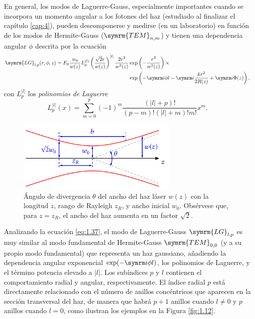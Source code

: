 En general, los modos de Laguerre-Gauss, especialmente importantes cuando se incorpora un momento angular a los fotones del haz (estudiado al finalizar el capítulo \ref{cap:4}), pueden descomponerse y medirse (en un laboratorio) en función de los modos de Hermite-Gauss \autocite{DErrico2017} ($\symrm{TEM}_{n,m}$) y tienen una dependencia angular $\phi$ descrita por la ecuación 
\begin{equation}\label{eq:1.37}
  \begin{split} 
    \symrm{LG}_{l,p}(r,\phi,z) = E_{0}\frac{w_{0}}{w(z)}L_{p}^{(l)} \left(\frac{\sqrt{2}r}{w(z)}\right)^{|l|}\frac{2r^{2}}{w^{2}(z)}&\exp \left(-\frac{r^{2}}{w^{2}(z)}\right)\times \\ 
    & \exp \left(- \iu \phi l - \iu \frac{kr^{2}}{2R(z)} + \iu \Phi(z)\right),
  \end{split}
\end{equation}
con $L_{p}^{|l|}$ los \emph{polinomios de Laguerre}
\begin{equation}\label{eq:1.38}
  L_{p}^{|l|}(x) = \sum_{m=0}^{p}(-1)^{m}\frac{(|l|+p)!}{(p-m)!(|l|+m)!m!}x^{m}.
\end{equation}

\begin{figure}[htbp]
  \centering
  \includegraphics[width=0.7\textwidth]{Figuras/ch1_beam_waist.pdf}
  \caption{Ángulo de divergencia $\theta$ del ancho del haz láser $w(z)$ con la longitud $z$, rango de Rayleigh $z_{R}$, y ancho inicial $w_{0}$. Obsérvese que, para $z=z_{R}$, el ancho del haz aumenta en un factor $\sqrt{2}$.}
  \label{fig:1.11}
\end{figure}

Analizando la ecuación \eqref{eq:1.37}, el modo de Laguerre-Gauss $\symrm{LG}_{l,p}$ es muy similar al modo fundamental de Hermite-Gauss $\symrm{TEM}_{0,0}$ (y a su propio modo fundamental) que representa un haz gaussiano, añadiendo la dependencia angular exponencial $\exp(-\iu \phi l)$, los polinomios de Laguerre, y el término potencia elevado a $|l|$. Los subíndices $p$ y $l$ contienen el comportamiento radial y angular, respectivamente. El índice radial $p$ está directamente relacionado con el número de anillos concéntricos que aparecen en la sección transversal del haz, de manera que habrá $p+1$ anillos cuando $l\neq 0$ y $p$ anillos cuando $l=0$, como ilustran los ejemplos en la Figura \ref{fig:1.12}. 

